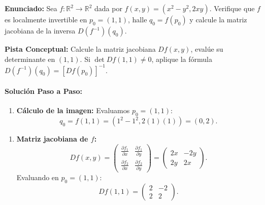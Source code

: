 \documentclass[11pt,a4paper]{article}
\begin{document}
\begin{tcolorbox}[colback=white,colframe=gray!40,arc=1mm,boxrule=0.5pt,left=3mm,right=3mm,top=2mm,bottom=2mm]
\textbf{Enunciado:} Sea $f: \mathbb{R}^2 \to \mathbb{R}^2$ dada por $f(x,y) = (x^2 - y^2, 2xy)$. Verifique que $f$ es localmente invertible en $p_0 = (1,1)$, halle $q_0 = f(p_0)$ y calcule la matriz jacobiana de la inversa $D(f^{-1})(q_0)$.
\end{tcolorbox}

\begin{tcolorbox}[colback=yellow!4,colframe=accentamber!70,arc=1mm,boxrule=0.5pt,left=3mm,right=3mm,top=1.5mm,bottom=1.5mm]
\textbf{Pista Conceptual:} Calcule la matriz jacobiana $Df(x,y)$, evalúe su determinante en $(1,1)$. Si $\det Df(1,1) \neq 0$, aplique la fórmula $D(f^{-1})(q_0) = [Df(p_0)]^{-1}$.
\end{tcolorbox}

\paragraph{Solución Paso a Paso:}\par
\begin{enumerate}[label=\textbf{\arabic*.}]
\item \textbf{Cálculo de la imagen:} Evaluamos $p_0 = (1,1)$:
\begin{equation*}
q_0 = f(1,1) = (1^2 - 1^2, 2(1)(1)) = (0,2).
\end{equation*}
\end{enumerate}

\begin{enumerate}[label=\textbf{\arabic*.}]
\item \textbf{Matriz jacobiana de $f$:}
\begin{equation*}
Df(x,y) = \begin{pmatrix} \frac{\partial f_1}{\partial x} & \frac{\partial f_1}{\partial y} \\ \frac{\partial f_2}{\partial x} & \frac{\partial f_2}{\partial y} \end{pmatrix} = \begin{pmatrix} 2x & -2y \\ 2y & 2x \end{pmatrix}.
\end{equation*}
Evaluando en $p_0 = (1,1)$:
\begin{equation*}
Df(1,1) = \begin{pmatrix} 2 & -2 \\ 2 & 2 \end{pmatrix}.
\end{equation*}
\end{enumerate}
\end{document}
